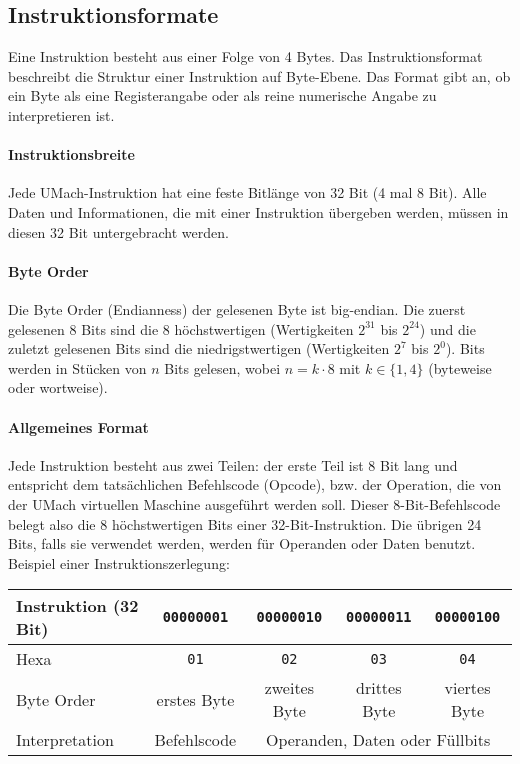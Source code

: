 \subsection{Instruktionsformate}
\label{subsec:Instruktionsformate}

Eine Instruktion besteht aus einer Folge von 4 Bytes.
Das Instruktionsformat beschreibt die Struktur einer Instruktion auf
Byte-Ebene. Das Format gibt an, ob ein Byte als eine Registerangabe oder als reine
numerische Angabe zu interpretieren ist.

\paragraph{Instruktionsbreite}
Jede UMach-Instruktion hat eine feste Bitlänge von 32 Bit (4 mal 8 Bit).
Alle Daten und Informationen, die mit einer Instruktion übergeben werden, müssen
in diesen 32 Bit untergebracht werden.

\paragraph{Byte Order}
Die Byte Order (Endianness) der gelesenen Byte ist
big-endian. Die zuerst gelesenen 8 Bits sind die 8 höchstwertigen (Wertigkeiten
$2^{31}$ bis $2^{24}$) und die zuletzt gelesenen Bits sind die niedrigstwertigen
(Wertigkeiten $2^{7}$ bis $2^{0}$). Bits werden in Stücken von $n$ Bits gelesen,
wobei $n = k \cdot 8$ mit $k \in \{1, 4\}$ (byteweise oder wortweise).

\paragraph{Allgemeines Format}
Jede Instruktion besteht aus zwei Teilen: der erste Teil ist 8 Bit lang und
entspricht dem tatsächlichen Befehlscode (Opcode), bzw. der Operation, die von
der UMach virtuellen Maschine ausgeführt werden soll. Dieser 8-Bit-Befehlscode
belegt also die 8 höchstwertigen Bits einer 32-Bit-Instruktion.  Die übrigen 24
Bits, falls sie verwendet werden, werden für Operanden oder Daten benutzt.
Beispiel einer Instruktionszerlegung:

\begin{center}
  \begin{tabular}{|l|*{4}{c|}}
    \hline
    Instruktion (32 Bit) &
    \texttt{00000001} & \texttt{00000010} & \texttt{00000011} & \texttt{00000100}
    \\\hline
    Hexa          &
    \texttt{01}   & \texttt{02}   & \texttt{03}   & \texttt{04}
    \\\hline
    Byte Order    &
    erstes Byte   & zweites Byte  & drittes Byte  & viertes Byte
    \\\hline
    Interpretation&
    Befehlscode   &  \multicolumn{3}{c|}{Operanden, Daten oder Füllbits}
    \\\hline
  \end{tabular}
\end{center}

